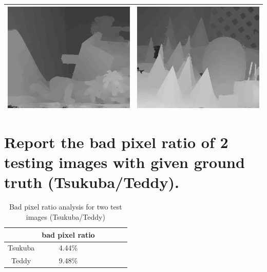 \documentclass[a4paper, 12pt]{article}
\begin{document}
\begin{table}[!htb]
\begin{tabular}{|c|c|}
        \includegraphics[scale=0.5]{./Teddy.png}   & \includegraphics[scale=0.5]{./Cones.png} \\
        \hline
    \end{tabular}
\end{table}

\section{Report the bad pixel ratio of 2 testing images with given ground truth (Tsukuba/Teddy).}

\begin{table}[!htb]
    \centering
    \caption{Bad pixel ratio analysis for two test images (Tsukuba/Teddy)}
    \begin{tabular}{|c|c|c|c|c|c|}
        \hline
                & bad pixel ratio \\
        \hline
        Tsukuba & 4.44\%          \\
        \hline
        Teddy   & 9.48\%          \\
        \hline
    \end{tabular}
\end{table}
\end{document}

